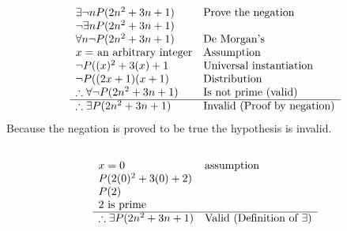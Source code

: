 \documentclass[letterpaper]{article}
\begin{document}
	\section{}
    	\subsection{}
        	\begin{displaymath}
        		\begin{array}{ll}
        			\exists \neg n P(2n^2 + 3n + 1) & $Prove the negation$\\
                    \neg \exists n P(2n^2 + 3n + 1) & \\
                  	\forall n \neg P(2n^2 + 3n + 1) & $De Morgan's$\\
                    x = $ an arbitrary integer$ & $Assumption$\\
                    \neg P((x)^2 + 3(x) + 1 & $Universal instantiation$\\
                    \neg P((2x + 1)(x + 1) & $Distribution$\\
					\therefore \forall \neg P(2n^2 + 3n + 1) & $Is not prime (valid)$\\
                    \hline
                    \therefore \exists P(2n^2 + 3n + 1) & $Invalid (Proof by negation)$\\
        		\end{array}
        	\end{displaymath}
            Because the negation is proved to be true the hypothesis is invalid.
		\subsection{}
        	\begin{displaymath}
            	\begin{array}{ll}
            		x = 0 & $assumption$\\
                    P(2(0)^2 + 3(0) + 2) &\\
                    P(2) &\\
                    2 $ is prime$ & \\
                    \hline
                    \therefore \exists P(2n^2 + 3n + 1) & $Valid (Definition of $\exists$)$\\
            	\end{array}
        	\end{displaymath}
\end{document}
